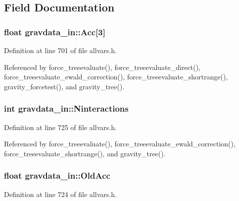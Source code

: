 \subsection{Field Documentation}
\hypertarget{structgravdata__in_a6850a5b240d113f9c28c27762d3c44ff}{
\subsubsection[{Acc}]{\setlength{\rightskip}{0pt plus 5cm}float {\bf gravdata\_\-in::Acc}\mbox{[}3\mbox{]}}}
\label{structgravdata__in_a6850a5b240d113f9c28c27762d3c44ff}


Definition at line 701 of file allvars.h.



Referenced by force\_\-treeevaluate(), force\_\-treeevaluate\_\-direct(), force\_\-treeevaluate\_\-ewald\_\-correction(), force\_\-treeevaluate\_\-shortrange(), gravity\_\-forcetest(), and gravity\_\-tree().

\hypertarget{structgravdata__in_a6b47f6ca387f17b375c949bbc9c0572f}{
\subsubsection[{Ninteractions}]{\setlength{\rightskip}{0pt plus 5cm}int {\bf gravdata\_\-in::Ninteractions}}}
\label{structgravdata__in_a6b47f6ca387f17b375c949bbc9c0572f}


Definition at line 725 of file allvars.h.



Referenced by force\_\-treeevaluate(), force\_\-treeevaluate\_\-ewald\_\-correction(), force\_\-treeevaluate\_\-shortrange(), and gravity\_\-tree().

\hypertarget{structgravdata__in_aba8345d83e2a1512a83563dbd87c9a3f}{
\subsubsection[{OldAcc}]{\setlength{\rightskip}{0pt plus 5cm}float {\bf gravdata\_\-in::OldAcc}}}
\label{structgravdata__in_aba8345d83e2a1512a83563dbd87c9a3f}


Definition at line 724 of file allvars.h.



